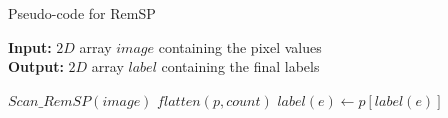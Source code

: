 \begin{algorithm}[H]
\small
{
	\caption{Pseudo-code for RemSP}
	\label{alg:RemSP}
	\textbf{Input:} $2D$ array $image$ containing the pixel values \\
	\textbf{Output:} $2D$ array $label$ containing the final labels
	\begin{algorithmic}[1]
		\State $Scan\_RemSP(image)$ 
		\State $flatten(p,count)$ 
		  
				\State $label(e) \gets p[label(e)]$
			\EndFor
		\EndFor
	\EndFunction
	\end{algorithmic}
}	
\end{algorithm}

